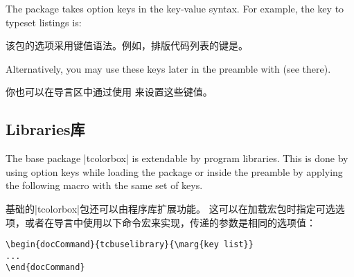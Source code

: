 The package takes option keys in the key-value syntax.%
For example, the key to typeset listings is:

该包的选项采用键值语法。例如，排版代码列表的键是。


\begin{dispListing}
\usepackage[listings]{tcolorbox}
\end{dispListing}

Alternatively, you may use these keys later in the preamble with  (see there).

你也可以在导言区中通过使用  来设置这些键值。%





\subsection{Libraries\hfill 库}\label{sec:bibliothek}

The base package |tcolorbox| is extendable by program libraries.%
This is done by using option keys while loading the package or inside
the preamble by applying the following macro with the same set of keys.

基础的|tcolorbox|包还可以由程序库扩展功能。%
这可以在加载宏包时指定可选选项，或者在导言中使用以下命令宏来实现，传递的参数是相同的选项值：

\begin{verbatim}
\begin{docCommand}{tcbuselibrary}{\marg{key list}}
...
\end{docCommand}  
\end{verbatim}




